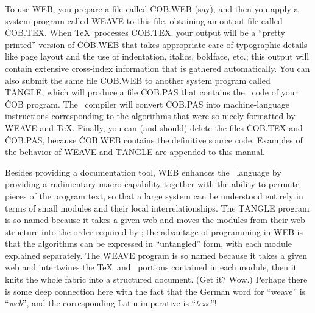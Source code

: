 To use \.{WEB}, you prepare a file called \.{COB.WEB} (say), and then you
apply a system program called \.{WEAVE} to this file, obtaining an output
file called \.{COB.TEX}.  When \TeX\ processes \.{COB.TEX}, your output
will be a ``pretty printed'' version of \.{COB.WEB} that takes appropriate
care of typographic details like page layout and the use of indentation,
italics, boldface, etc.; this output will contain extensive cross-index
information that is gathered automatically. You can also submit the same
file \.{COB.WEB} to another system program called \.{TANGLE}, which will
produce a file \.{COB.PAS} that contains the \PASCAL\ code of your \.{COB}
program. The \PASCAL\ compiler will convert \.{COB.PAS} into
machine-language instructions corresponding to the algorithms that were so
nicely formatted by \.{WEAVE} and \TeX. Finally, you can (and should)
delete the files \.{COB.TEX} and \.{COB.PAS}, because \.{COB.WEB} contains
the definitive source code. Examples of the behavior of \.{WEAVE} and
\.{TANGLE} are appended to this manual.

Besides providing a documentation tool, \.{WEB} enhances the \PASCAL\
language by providing a rudimentary macro capability together with the
ability to permute pieces of the program text, so that a large system can
be understood entirely in terms of small modules and their local
interrelationships.  The \.{TANGLE} program is so named because it takes a
given web and moves the modules from their web structure into the order
required by \PASCAL; the advantage of programming in \.{WEB} is that the
algorithms can be expressed in ``untangled'' form, with each module
explained separately.  The \.{WEAVE} program is so named because it takes
a given web and intertwines the \TeX\ and \PASCAL\ portions contained in
each module, then it knits the whole fabric into a structured document.
(Get it? Wow.)  Perhaps there is some deep connection here with the fact
that the German word for ``weave'' is ``{\it web\/}'', and the
corresponding Latin imperative is ``{\it texe\/}''!

